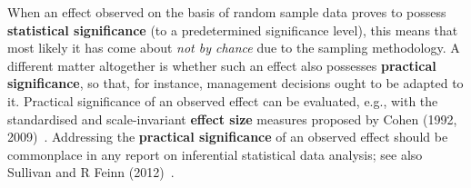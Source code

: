 \medskip
\noindent
When an effect observed on the basis of random sample data proves 
to possess \textbf{statistical signifi\-cance} (to a predetermined 
significance level), this means that most likely it has come about 
\textit{not by chance} due to the sampling methodology. A different 
matter altogether is whether such an effect also possesses
\textbf{practical significance}, so that, for instance, management 
decisions ought to be adapted to it. Practical significance of
an observed effect can be evaluated, e.g., with the standardised
and scale-invariant \textbf{effect size} measures proposed by Cohen
(1992, 2009)~. Addressing the \textbf{practical
significance} of an observed effect should be commonplace in any
report on inferential statistical data analysis; see also Sullivan
and R Feinn (2012)~.

